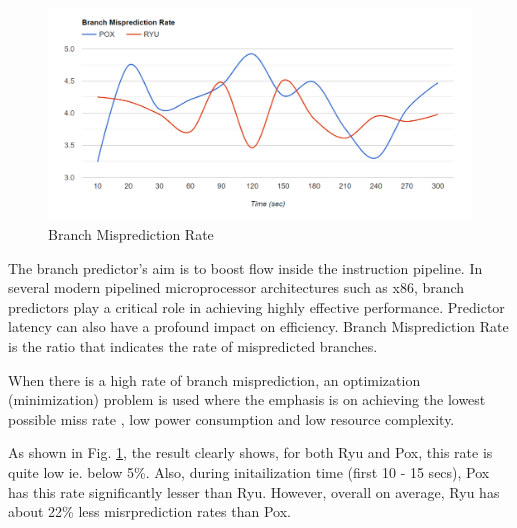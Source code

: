 \begin{figure}[!hbt]
    \centering
        \includegraphics[width=\textwidth,keepaspectratio]{images/branch_mispredicted.png}
       \caption{Branch Misprediction Rate}
        \label{branchmisprediction}
\end{figure}

The branch predictor's aim is to boost flow inside the instruction pipeline. In several modern pipelined microprocessor architectures such as x86, branch predictors play a critical role in achieving highly effective performance. Predictor latency can also have
a profound impact on efficiency. Branch Misprediction Rate is the ratio that indicates the rate of mispredicted branches.

When there is a high rate of branch misprediction, an optimization (minimization) problem is used where the
emphasis is on achieving the lowest possible miss rate , low power consumption and low resource complexity. 

As shown in Fig. \ref{branchmisprediction}, the result clearly shows, for both Ryu and Pox, this rate is quite low ie. below 5\%. Also, during initailization time (first 10 - 15 secs), Pox has this rate significantly lesser than Ryu. However, overall on average, Ryu has about 22\% less misrprediction rates than Pox.